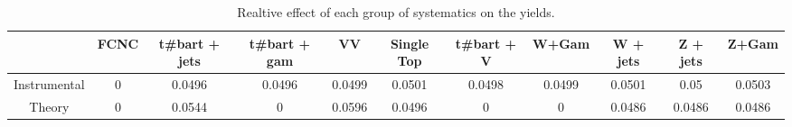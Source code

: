 \begin{table}[htbp]
\begin{center}
\begin{tabular}{|c|c|c|c|c|c|c|c|c|c|c|}
\hline 
      & FCNC      & t#bar{t} + jets      & t#bar{t} +  gam      & VV      & Single Top      & t#bar{t} + V      & W+Gam      & W + jets      & Z + jets      & Z+Gam \\ 
\hline 
 Instrumental & 0 & 0.0496 & 0.0496 & 0.0499 & 0.0501 & 0.0498 & 0.0499 & 0.0501 & 0.05 & 0.0503 \\ 
 Theory & 0 & 0.0544 & 0 & 0.0596 & 0.0496 & 0 & 0 & 0.0486 & 0.0486 & 0.0486 \\ 
\hline 
\end{tabular} 
\caption{Realtive effect of each group of systematics on the yields.} 
\end{center} 
\end{table} 
